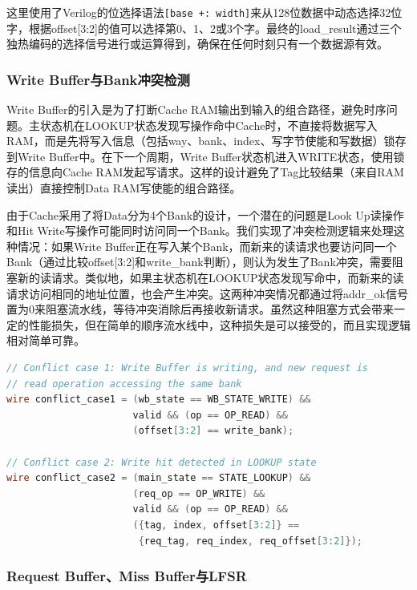 \documentclass[11pt]{article}
\begin{document}
这里使用了Verilog的位选择语法\texttt{[base +: width]}来从128位数据中动态选择32位字，根据offset[3:2]的值可以选择第0、1、2或3个字。最终的load\_result通过三个独热编码的选择信号进行或运算得到，确保在任何时刻只有一个数据源有效。

\subsubsection{Write Buffer与Bank冲突检测}

Write Buffer的引入是为了打断Cache RAM输出到输入的组合路径，避免时序问题。主状态机在LOOKUP状态发现写操作命中Cache时，不直接将数据写入RAM，而是先将写入信息（包括way、bank、index、写字节使能和写数据）锁存到Write Buffer中。在下一个周期，Write Buffer状态机进入WRITE状态，使用锁存的信息向Cache RAM发起写请求。这样的设计避免了Tag比较结果（来自RAM读出）直接控制Data RAM写使能的组合路径。

由于Cache采用了将Data分为4个Bank的设计，一个潜在的问题是Look Up读操作和Hit Write写操作可能同时访问同一个Bank。我们实现了冲突检测逻辑来处理这种情况：如果Write Buffer正在写入某个Bank，而新来的读请求也要访问同一个Bank（通过比较offset[3:2]和write\_bank判断），则认为发生了Bank冲突，需要阻塞新的读请求。类似地，如果主状态机在LOOKUP状态发现写命中，而新来的读请求访问相同的地址位置，也会产生冲突。这两种冲突情况都通过将addr\_ok信号置为0来阻塞流水线，等待冲突消除后再接收新请求。虽然这种阻塞方式会带来一定的性能损失，但在简单的顺序流水线中，这种损失是可以接受的，而且实现逻辑相对简单可靠。

\begin{lstlisting}[language=Verilog]
// Conflict case 1: Write Buffer is writing, and new request is 
// read operation accessing the same bank
wire conflict_case1 = (wb_state == WB_STATE_WRITE) &&
                      valid && (op == OP_READ) &&
                      (offset[3:2] == write_bank);

// Conflict case 2: Write hit detected in LOOKUP state
wire conflict_case2 = (main_state == STATE_LOOKUP) &&
                      (req_op == OP_WRITE) &&
                      valid && (op == OP_READ) &&
                      ({tag, index, offset[3:2]} == 
                       {req_tag, req_index, req_offset[3:2]});
\end{lstlisting}

\subsubsection{Request Buffer、Miss Buffer与LFSR}
\end{document}
